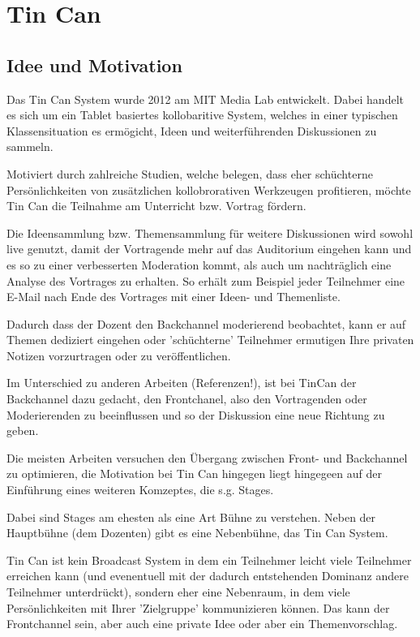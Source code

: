 \section{Tin Can}

\subsection{Idee und Motivation}
Das Tin Can System \cite{HarGorSch2012} wurde 2012 am MIT Media Lab entwickelt.
Dabei handelt es sich um ein Tablet basiertes kollobaritive System, welches in
einer typischen Klassensituation es ermögicht, Ideen und wei\-ter\-führ\-en\-den
Diskussionen zu sammeln.

Motiviert durch zahlreiche Studien, welche belegen, dass eher schüchterne
Persönlichkeiten von zusätzlichen kollobrorativen Werkzeugen profitieren, möchte
Tin Can die Teilnahme am Unterricht bzw. Vortrag fördern.

Die Ideensammlung bzw. Themensammlung für weitere Diskussionen wird sowohl live
genutzt, damit der Vortragende mehr auf das Auditorium eingehen kann und es so
zu einer verbesserten Moderation kommt, als auch um nach\-träglich eine Analyse
des Vortrages zu erhalten. So erhält zum Beispiel jeder Teilnehmer eine E-Mail
nach Ende des Vortrages mit einer Ideen- und Themenliste.

Dadurch dass der Dozent den Backchannel moderierend beobachtet, kann er auf
Themen dediziert eingehen oder 'schüchterne' Teilnehmer ermutigen Ihre privaten
Notizen vorzurtragen oder zu veröffentlichen.

Im Unterschied zu anderen Arbeiten (Referenzen!), ist bei TinCan der Backchannel
dazu gedacht, den Frontchanel, also den Vortragenden oder Moderierenden zu
beeinflussen und so der Diskussion eine neue Richtung zu geben.

Die meisten Arbeiten versuchen den Übergang zwischen Front- und Backchannel zu
optimieren, die Motivation bei Tin Can hingegen liegt hingegeen auf der
Einführung eines weiteren Komzeptes, die s.g. Stages.

Dabei sind Stages am ehesten als eine Art Bühne zu verstehen. Neben der
Hauptbühne (dem Dozenten) gibt es eine Nebenbühne, das Tin Can System.

Tin Can ist kein Broadcast System in dem ein Teilnehmer leicht viele Teilnehmer
erreichen kann (und evenentuell mit der dadurch entstehenden Dominanz andere
Teilnehmer unterdrückt), sondern eher eine Nebenraum, in dem viele
Persönlichkeiten mit Ihrer 'Zielgruppe' kommunizieren können. Das kann der
Frontchannel sein, aber auch eine private Idee oder aber ein Themenvorschlag.

